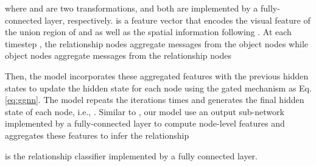 \documentclass[10pt,twocolumn,letterpaper]{article}
\begin{document}
where  and  are two transformations, and both are implemented by a fully-connected layer, respectively.  is a feature vector that encodes the visual feature of the union region of  and  as well as the spatial information following \cite{zellers2017neural}. At each timestep , the relationship nodes aggregate messages from the object nodes while object nodes aggregate messages from the relationship nodes

Then, the model incorporates these aggregated features with the previous hidden states to update the hidden state for each node using the gated mechanism as Eq. \ref{eq:ggnn}. The model repeats the iterations  times and generates the final hidden state of each node, i.e., . Similar to \cite{li2016gated}, our model use an output sub-network implemented by a fully-connected layer to compute node-level features and aggregates these features to infer the relationship

 is the relationship classifier implemented by a fully connected layer.
\end{document}
